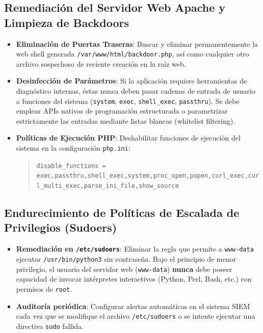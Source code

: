 \documentclass[11pt,a4paper]{article}
\begin{document}
\subsection{Remediación del Servidor Web Apache y Limpieza de Backdoors}
\begin{itemize}
    \item \textbf{Eliminación de Puertas Traseras}: Buscar y eliminar permanentemente la web shell generada \texttt{/var/www/html/backdoor.php}, así como cualquier otro archivo sospechoso de reciente creación en la raíz web.
    \item \textbf{Desinfección de Parámetros}: Si la aplicación requiere herramientas de diagnóstico internas, éstas nunca deben pasar cadenas de entrada de usuario a funciones del sistema (\texttt{system}, \texttt{exec}, \texttt{shell\_exec}, \texttt{passthru}). Se debe emplear APIs nativas de programación estructurada o parametrizar estrictamente las entradas mediante listas blancas (whitelist filtering).
    \item \textbf{Políticas de Ejecución PHP}: Deshabilitar funciones de ejecución del sistema en la configuración \texttt{php.ini}:
    \begin{quote}
        \texttt{disable\_functions = exec,passthru,shell\_exec,system,proc\_open,popen,curl\_exec,curl\_multi\_exec,parse\_ini\_file,show\_source}
    \end{quote}
\end{itemize}

\subsection{Endurecimiento de Políticas de Escalada de Privilegios (Sudoers)}
\begin{itemize}
    \item \textbf{Remediación en \texttt{/etc/sudoers}}: Eliminar la regla que permite a \texttt{www-data} ejecutar \texttt{/usr/bin/python3} sin contraseña. Bajo el principio de menor privilegio, el usuario del servidor web (\texttt{www-data}) \textbf{nunca} debe poseer capacidad de invocar intérpretes interactivos (Python, Perl, Bash, etc.) con permisos de \texttt{root}.
    \item \textbf{Auditoría periódica}: Configurar alertas automáticas en el sistema SIEM cada vez que se modifique el archivo \texttt{/etc/sudoers} o se intente ejecutar una directiva \texttt{sudo} fallida.
\end{itemize}
\end{document}
